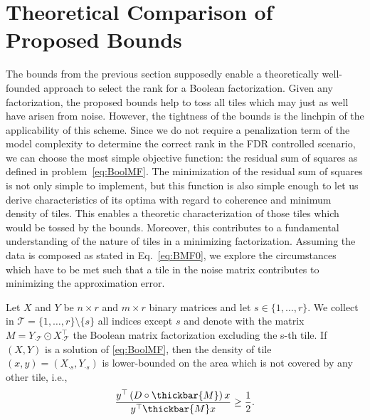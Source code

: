 \section{Theoretical Comparison of Proposed Bounds}\label{sec:theoryCompare}
The bounds from the previous section supposedly enable a theoretically well-founded approach to select the rank for a Boolean factorization. Given any factorization, the proposed bounds help to toss all tiles which may just as well have arisen from noise.
However, the tightness of the bounds is the linchpin of the applicability of this scheme. 
Since we do not require a penalization term of the model complexity to determine the correct rank in the FDR controlled scenario, we can choose the most simple objective function: the residual sum of squares as defined in problem~\eqref{eq:BoolMF}.
The minimization of the residual sum of squares is not only simple to implement, but this function is also simple enough to let us derive characteristics of its optima with regard to coherence and minimum density of tiles. This enables a theoretic characterization of those tiles which would be tossed by the bounds. Moreover, this contributes to a fundamental understanding of the nature of tiles in a minimizing factorization. Assuming the data is composed as stated in Eq.~\eqref{eq:BMF0}, we explore the circumstances which have to be met such that a tile in the noise matrix contributes to minimizing the approximation error.
\begin{lemma}\label{thm:minDensOverlap}
Let $X$ and $Y$ be $n\times r$ and $m\times r$ binary matrices and let $s\in\{1,\ldots,r\}$. We collect in $\mathcal{T}=\{1,\ldots,r\}\setminus\{s\}$ all indices except $s$ and denote with the matrix $M=Y_{\cdot \mathcal{T}}\odot X_{\cdot \mathcal{T}}^\top$ the Boolean matrix factorization excluding the s-th tile. If $(X,Y)$ is a solution of \eqref{eq:BoolMF}, then the density of tile $(x,y)=(X_{\cdot s},Y_{\cdot s})$ is lower-bounded on the area which is  not covered by any other tile, i.e.,
\begin{align}\label{eq:densOverlap}
\frac{y^\top \left(D\circ \thickbar{M}\right)x}{y^\top \thickbar{M}x}
\geq \frac{1}{2}.
\end{align}
\end{lemma}
